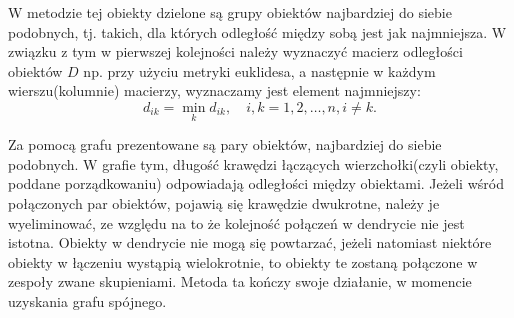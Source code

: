 \documentclass[12pt,a4paper]{report}
\begin{document}
W metodzie tej obiekty dzielone są grupy obiektów najbardziej do siebie podobnych, tj. takich, dla których odległość między sobą jest jak najmniejsza. W związku z tym w pierwszej kolejności należy wyznaczyć macierz odległości obiektów $D$ np. przy użyciu metryki euklidesa, a następnie w każdym wierszu(kolumnie) macierzy, wyznaczamy jest element najmniejszy: 
$$
d_{ik}= \min\limits_{k} {d_{ik}}, \quad i,k=1,2,\dots,n, i\neq k.
$$

Za pomocą grafu prezentowane są pary obiektów, najbardziej do siebie podobnych. W grafie tym, długość krawędzi łączących wierzchołki(czyli obiekty, poddane porządkowaniu) odpowiadają odległości między obiektami. Jeżeli wśród połączonych par obiektów, pojawią się krawędzie dwukrotne, należy je wyeliminować, ze względu na to że kolejność połączeń w dendrycie nie jest istotna. Obiekty w dendrycie nie mogą się powtarzać, jeżeli natomiast niektóre obiekty w łączeniu wystąpią wielokrotnie, to obiekty te zostaną połączone w zespoły zwane skupieniami. Metoda ta kończy swoje działanie, w momencie uzyskania grafu spójnego. 

\end{document}
